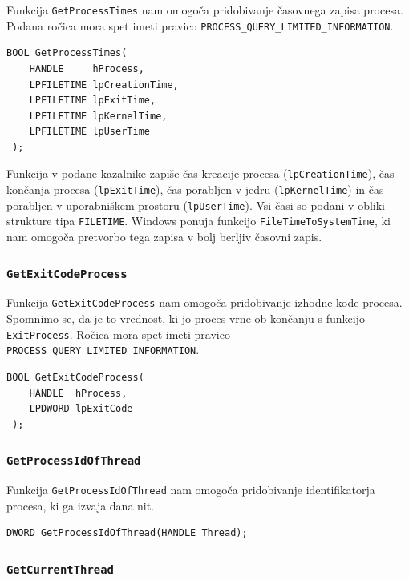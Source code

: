 \documentclass[a4paper,12pt,openright]{book}
\begin{document}
Funkcija \texttt{GetProcessTimes} nam omogoča pridobivanje časovnega zapisa procesa.
Podana ročica mora spet imeti pravico \texttt{PROCESS\_QUERY\_LIMITED\_INFORMATION}.

\begin{lstlisting}[style=func]
 BOOL GetProcessTimes(
	HANDLE     hProcess,
	LPFILETIME lpCreationTime,
	LPFILETIME lpExitTime,
	LPFILETIME lpKernelTime,
	LPFILETIME lpUserTime
 );
\end{lstlisting}

Funkcija v podane kazalnike zapiše čas kreacije procesa (\texttt{lpCreationTime}), čas končanja procesa (\texttt{lpExitTime}), čas porabljen v jedru (\texttt{lpKernelTime}) in čas porabljen v uporabniškem prostoru (\texttt{lpUserTime}).
Vsi časi so podani v obliki strukture tipa \texttt{FILETIME}.
Windows ponuja funkcijo \texttt{FileTimeToSystemTime}, ki nam omogoča pretvorbo tega zapisa v bolj berljiv časovni zapis.

\subsubsection{\texttt{GetExitCodeProcess}}

Funkcija \texttt{GetExitCodeProcess} nam omogoča pridobivanje izhodne kode procesa.
Spomnimo se, da je to vrednost, ki jo proces vrne ob končanju s funkcijo \texttt{ExitProcess}.
Ročica mora spet imeti pravico \texttt{PROCESS\_QUERY\_LIMITED\_INFORMATION}.

\begin{lstlisting}[style=func]
 BOOL GetExitCodeProcess(
	HANDLE  hProcess,
	LPDWORD lpExitCode
 );
\end{lstlisting}

\subsubsection{\texttt{GetProcessIdOfThread}}

Funkcija \texttt{GetProcessIdOfThread} nam omogoča pridobivanje identifikatorja procesa, ki ga izvaja dana nit.

\begin{lstlisting}[style=func]
 DWORD GetProcessIdOfThread(HANDLE Thread);
\end{lstlisting}

\subsubsection{\texttt{GetCurrentThread}}
\end{document}

